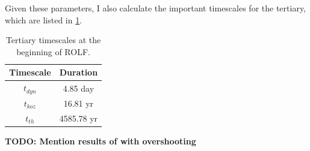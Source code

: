 Given these parameters, I also calculate the important timescales for the tertiary, which are listed in \cref{tab:tertiary_timescale_ROLF}.
\begin{table}[H]
    \centering
    \begin{tabular}{| c | c |}
       Timescale & Duration \\
       \hline
       $t_{dyn}$ & 4.85 day\\
       $t_{koz}$ & 16.81 yr\\
       $t_{th}$ & 4585.78 yr 
    \end{tabular}
    \caption{ Tertiary timescales at the beginning of ROLF.}
    \label{tab:tertiary_timescale_ROLF}
\end{table}

{\bf TODO: Mention results of with overshooting}


